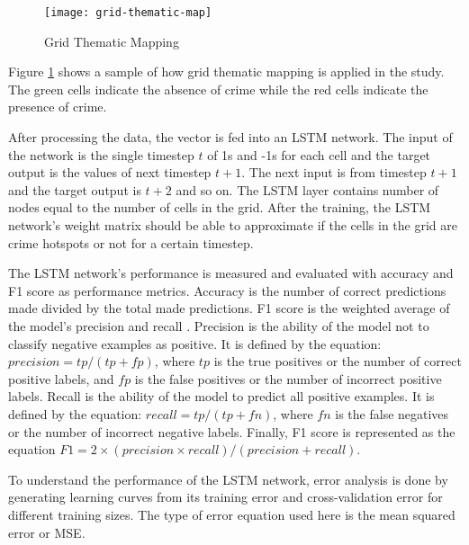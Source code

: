 \begin{figure}[H]
    \centering
    \texttt{[image: grid-thematic-map]}
    \caption{Grid Thematic Mapping}
    \label{fig:grid-thematic-map}
\end{figure}

Figure \ref{fig:grid-thematic-map} shows a sample of how grid thematic mapping is applied in the study. The green cells indicate the absence of crime while the red cells indicate the presence of crime.

After processing the data, the vector is fed into an LSTM network. The input of the network is the single timestep $t$ of 1s and -1s for each cell and the target output is the values of next timestep $t+1$. The next input is from timestep $t+1$ and the target output is $t+2$ and so on. The LSTM layer contains number of nodes equal to the number of cells in the grid. After the training, the LSTM network's weight matrix should be able to approximate if the cells in the grid are crime hotspots or not for a certain timestep.

The LSTM network's performance is measured and evaluated with accuracy and F1 score as performance metrics. Accuracy is the number of correct predictions made divided by the total made predictions. F1 score is the weighted average of the model's precision and recall \citep{scikit-learn}. Precision is the ability of the model not to classify negative examples as positive. It is defined by the equation: \( precision = tp / (tp + fp) \), where $tp$ is the true positives or the number of correct positive labels, and $fp$ is the false positives or the number of incorrect positive labels. Recall is the ability of the model to predict all positive examples. It is defined by the equation: \( recall = tp / (tp + fn) \), where $fn$ is the false negatives or the number of incorrect negative labels. Finally, F1 score is represented as the equation \(F1 = 2 \times (precision \times recall) / (precision + recall)\).

To understand the performance of the LSTM network, error analysis is done by generating learning curves from its training error and cross-validation error for different training sizes. The type of error equation used here is the mean squared error or MSE.